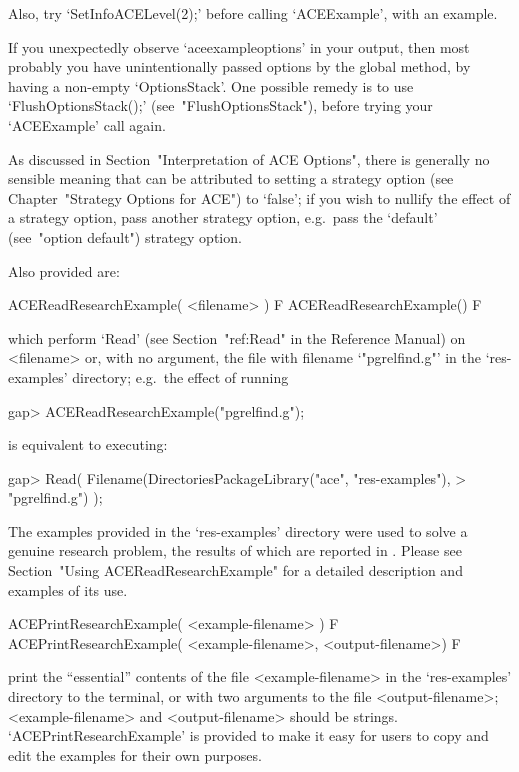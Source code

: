 Also, try `SetInfoACELevel(2);' before  calling `ACEExample', with  an
example.

If you unexpectedly observe `aceexampleoptions' in your  output,  then
most probably you have unintentionally passed options  by  the  global
method, by having a non-empty `OptionsStack'. One possible  remedy  is
to use `FlushOptionsStack();' (see~"FlushOptionsStack"), before trying
your `ACEExample' call again.

As discussed in Section~"Interpretation  of  ACE  Options",  there  is
generally no sensible meaning that can  be  attributed  to  setting  a
strategy option (see Chapter~"Strategy Options for ACE")  to  `false';
if you wish to nullify the effect of a strategy option,  pass  another
strategy  option,  e.g.~pass  the  `default'  (see~"option   default")
strategy option.

Also provided are:

\> ACEReadResearchExample( <filename> ) F
\> ACEReadResearchExample() F

which perform `Read' (see Section~"ref:Read" in the  {\GAP}  Reference
Manual) on <filename> or, with no argument,  the  file  with  filename
`"pgrelfind.g"' in the `res-examples' directory;  e.g.~the  effect  of
running

\beginexample
gap> ACEReadResearchExample("pgrelfind.g");
\endexample

is equivalent to executing:

\beginexample
gap> Read( Filename(DirectoriesPackageLibrary("ace", "res-examples"),
>                   "pgrelfind.g") );
\endexample

The examples provided in the `res-examples'  directory  were  used  to
solve a genuine research problem, the results of which are reported in
\cite{CHHR01}. Please see Section~"Using  ACEReadResearchExample"  for
a detailed description and examples of its use.

\> ACEPrintResearchExample( <example-filename> ) F
\> ACEPrintResearchExample( <example-filename>, <output-filename>) F

print the ``essential'' contents of the file <example-filename> in the
`res-examples' directory to the terminal, or with two arguments to the
file  <output-filename>;  <example-filename>   and   <output-filename>
should be strings. `ACEPrintResearchExample' is provided  to  make  it
easy for users to copy and edit the examples for their own purposes.


